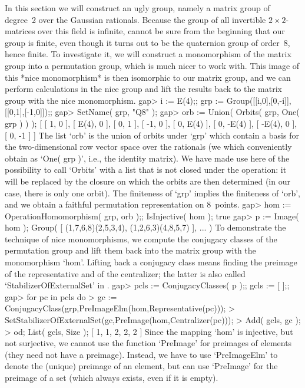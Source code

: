 
In this section we will construct an ugly group, namely a matrix group of
degree~2 over the Gaussian rationals. Because the group of all invertible
$2\times 2$-matrices over this  field is infinite,  {\GAP} cannot be sure
from the beginning that our group is finite, even though  it turns out to
be the quaternion  group of order~8, hence  finite. To investigate it, we
will construct  a  monomorphism of  the matrix  group into a  permutation
group, which  is much   nicer  to work with.  This   image of this  *nice
monomorphism* is then isomorphic to our  matrix group, and we can perform
calculations in the nice  group and lift the  results back to the  matrix
group with the nice monomorphism.
\beginexample
    gap> i := E(4);; grp := Group([[i,0],[0,-i]],[[0,1],[-1,0]]);;
    gap> SetName( grp, "Q8" );
    gap> orb := Union( Orbits( grp, One( grp ) ) );
    [ [ 1, 0 ], [ E(4), 0 ], [ 0, 1 ], [ -1, 0 ], [ 0, E(4) ],
        [ 0, -E(4) ], [ -E(4), 0 ], [ 0, -1 ] ]
\endexample
The list `orb' is the  union of orbits under `grp'  which contain a basis
for the  two-dimensional row  vector space over   the rationals (we which
conveniently obtain as `One( grp )',  i.e., the identity matrix). We have
made use here of the possibility to call `Orbits' with a list that is not
closed under the operation:  it will be replaced by  the closure on which
the orbits  are then determined (in our  case, there  is only one orbit).
The finiteness of `grp' implies the finiteness of `orb',  and we obtain a
faithful permutation representation on 8~points.
\beginexample
    gap> hom := OperationHomomorphism( grp, orb );; IsInjective( hom );
    true
    gap> p := Image( hom );
    Group( [ (1,7,6,8)(2,5,3,4), (1,2,6,3)(4,8,5,7) ], ... )
\endexample
To   demonstrate  the technique of  nice    monomorphisms, we compute the
conjugacy classes of  the permutation group and  lift them back  into the
matrix group with the monomorphism `hom'.  Lifting back a conjugacy class
means finding the preimage of  the representative and of the centralizer;
the latter is also called `StabilizerOfExternalSet' in {\GAP}.
\beginexample
    gap> pcls := ConjugacyClasses( p );; gcls := [  ];;
    gap> for pc  in pcls  do
    >      gc := ConjugacyClass(grp,PreImageElm(hom,Representative(pc)));
    >      SetStabilizerOfExternalSet(gc,PreImage(hom,Centralizer(pc)));
    >      Add( gcls, gc );
    >    od; List( gcls, Size );
    [ 1, 1, 2, 2, 2 ]
\endexample
Since the  mapping `hom' is injective, but  not surjective, we cannot use
the function `PreImage' for  preimages of elements  (they need not have a
preimage). Instead,  we have to use `PreImageElm'  to denote the (unique)
preimage of an element, but can use `PreImage'  for the preimage of a set
(which always exists, even if it is empty).

